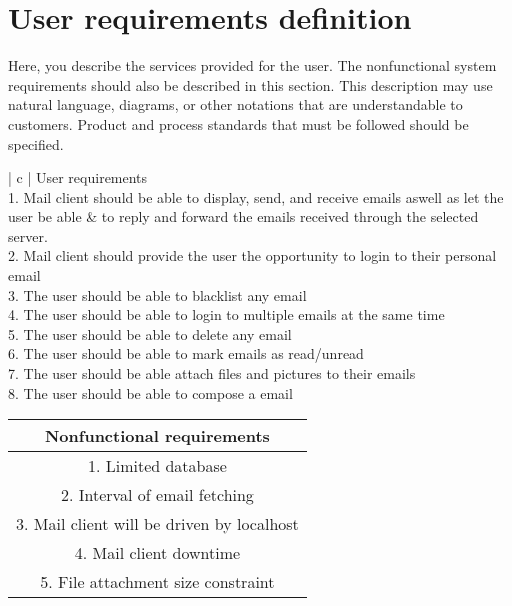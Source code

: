 \documentclass{article}
\begin{document}
\section*{User requirements definition}
Here, you describe the services provided for the user. The nonfunctional system requirements should also
be described in this section. This description may use natural language, diagrams, or other notations that are
understandable to customers. Product and process standards that must be followed should be specified.
\begin{center}
\begin{tabular}{| c |}
 \hline
 User requirements\\
 \hline 
 1. Mail client should be able to display, send, and receive emails aswell as let the user be able &  to reply and forward the emails received through the selected server. \\
 \hline
 2. Mail client should provide the user the opportunity to login to their personal email\\
 \hline
 3. The user should be able to blacklist any email\\
 \hline
 4. The user should be able to login to multiple emails at the same time\\
 \hline
 5. The user should be able to delete any email\\
 \hline
 6. The user should be able to mark emails as read/unread\\
 \hline
 7. The user should be able attach files and pictures to their emails\\
 \hline
 8. The user should be able to compose a email\\

\end{tabular}
\end{center}

\begin{center}
\begin{tabular}{| c |}
 \hline
 Nonfunctional requirements\\
 \hline 
 \rowcolor{cornflowerblue}
 1. Limited database \\
 \hline
 \rowcolor{cornflowerblue}
 2. Interval of email fetching\\
 \hline
 \rowcolor{cornflowerblue}
 3. Mail client will be driven by localhost\\
 \hline
 \rowcolor{cornflowerblue}
 4. Mail client downtime\\
 \hline
 \rowcolor{cornflowerblue}
 5. File attachment size constraint\\
 \hline
\end{tabular}
\end{center}
\end{document}
